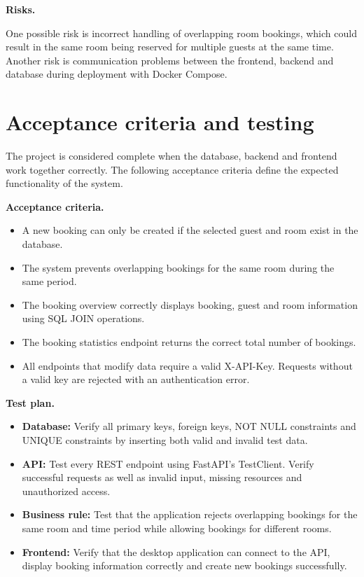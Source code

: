 \documentclass[11pt,a4paper]{article}
\begin{document}
\textbf{Risks.}

One possible risk is incorrect handling of overlapping room bookings, which
could result in the same room being reserved for multiple guests at the same
time. Another risk is communication problems between the frontend, backend and
database during deployment with Docker Compose.

\section{Acceptance criteria and testing}

The project is considered complete when the database, backend and frontend
work together correctly. The following acceptance criteria define the expected
functionality of the system.

\textbf{Acceptance criteria.}

\begin{itemize}[topsep=2pt]
    \item A new booking can only be created if the selected guest and room
    exist in the database.
    
    \item The system prevents overlapping bookings for the same room during the
    same period.
    
    \item The booking overview correctly displays booking, guest and room
    information using SQL JOIN operations.
    
    \item The booking statistics endpoint returns the correct total number of
    bookings.
    
    \item All endpoints that modify data require a valid X-API-Key. Requests
    without a valid key are rejected with an authentication error.
\end{itemize}

\textbf{Test plan.}

\begin{itemize}[topsep=2pt]

\item \textbf{Database:}
Verify all primary keys, foreign keys, NOT NULL constraints and UNIQUE
constraints by inserting both valid and invalid test data.

\item \textbf{API:}
Test every REST endpoint using FastAPI's TestClient. Verify successful
requests as well as invalid input, missing resources and unauthorized access.

\item \textbf{Business rule:}
Test that the application rejects overlapping bookings for the same room and
time period while allowing bookings for different rooms.

\item \textbf{Frontend:}
Verify that the desktop application can connect to the API, display booking
information correctly and create new bookings successfully.

\end{itemize}
\end{document}

